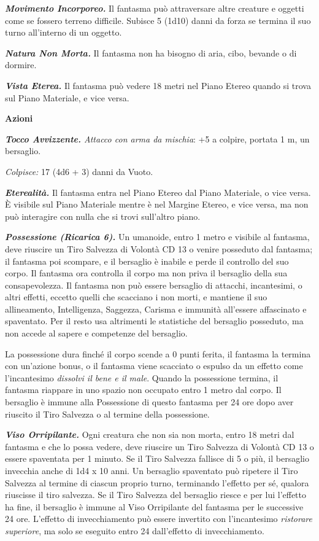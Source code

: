 \begin{multicols}{2}
\emph{\textbf{Movimento Incorporeo.}} Il fantasma può attraversare altre creature e oggetti come se fossero terreno difficile. Subisce 5 (1d10) danni da forza se termina il suo turno all'interno di un oggetto. 

\emph{\textbf{Natura Non Morta.}} Il fantasma non ha bisogno di aria, cibo, bevande o di dormire.

\emph{\textbf{Vista Eterea.}} Il fantasma può vedere 18 metri nel Piano Etereo quando si trova sul Piano Materiale, e vice versa.

\textbf{Azioni}

\emph{\textbf{Tocco Avvizzente.} Attacco con arma da mischia}: +5 a colpire, portata 1 m, un bersaglio.

\emph{Colpisce:} 17 (4d6 + 3) danni da Vuoto.

\emph{\textbf{Eterealità.}} Il fantasma entra nel Piano Etereo dal Piano Materiale, o vice versa. È visibile sul Piano Materiale mentre è nel Margine Etereo, e vice versa, ma non può interagire con nulla che si trovi sull'altro piano.

\emph{\textbf{Possessione (Ricarica 6).}} Un umanoide, entro 1 metro e visibile al fantasma, deve riuscire un Tiro Salvezza di Volontà CD 13 o venire posseduto dal fantasma; il fantasma poi scompare, e il bersaglio è inabile e perde il controllo del suo corpo. Il fantasma ora controlla il corpo ma non priva il bersaglio della sua consapevolezza. Il fantasma non può essere bersaglio di attacchi, incantesimi, o altri effetti, eccetto quelli che scacciano i non morti, e mantiene il suo allineamento, Intelligenza, Saggezza, Carisma e immunità all'essere affascinato e spaventato. Per il resto usa altrimenti le statistiche del bersaglio posseduto, ma non accede al sapere e competenze del bersaglio.

La possessione dura finché il corpo scende a 0 punti ferita, il fantasma la termina con un'azione bonus, o il fantasma viene scacciato o espulso da un effetto come l'incantesimo \emph{dissolvi il bene e il male}. Quando la possessione termina, il fantasma riappare in uno spazio non occupato entro 1 metro dal corpo. Il bersaglio è immune alla Possessione di questo fantasma per 24 ore dopo aver riuscito il Tiro Salvezza o al termine della possessione.

\emph{\textbf{Viso Orripilante.}} Ogni creatura che non sia non morta, entro 18 metri dal fantasma e che lo possa vedere, deve riuscire un Tiro Salvezza di Volontà CD 13 o essere spaventata per 1 minuto. Se il Tiro Salvezza fallisce di 5 o più, il bersaglio invecchia anche di 1d4 x 10 anni. Un  bersaglio spaventato può ripetere il Tiro Salvezza al termine di ciascun proprio turno, terminando l'effetto per sé, qualora riuscisse il tiro  salvezza. Se il Tiro Salvezza del bersaglio riesce e per lui l'effetto ha fine, il bersaglio è immune al Viso Orripilante del fantasma per le successive 24  ore. L'effetto di invecchiamento può essere invertito con l'incantesimo \emph{ristorare superiore}, ma solo se eseguito entro 24 dall'effetto di  invecchiamento.


\end{multicols}
